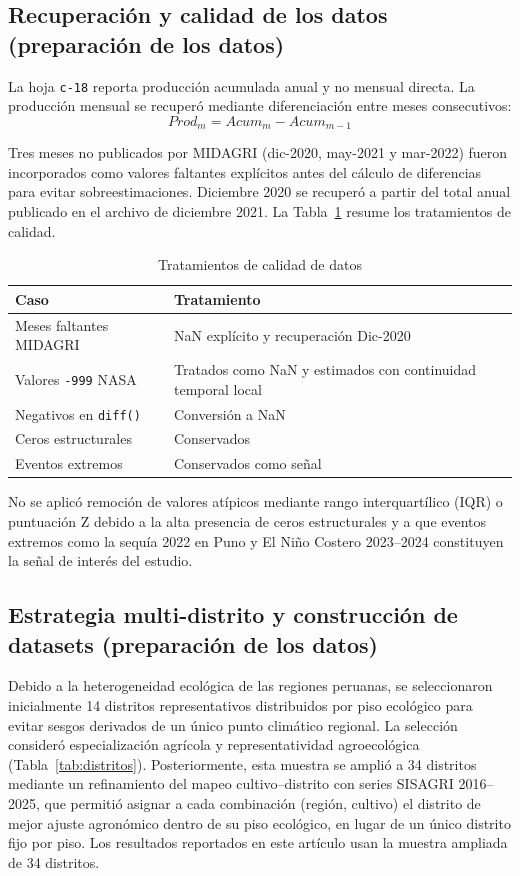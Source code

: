 \documentclass[conference]{IEEEtran}
\begin{document}
\subsection{Recuperación y calidad de los datos (preparación de los datos)}
\label{ssec:recuperacion}
La hoja \texttt{c-18} reporta producción acumulada anual y no mensual directa. La producción mensual se recuperó mediante diferenciación entre meses consecutivos:
\begin{equation}
Prod_{m} = Acum_{m} - Acum_{m-1}
\end{equation}

Tres meses no publicados por MIDAGRI (dic-2020, may-2021 y mar-2022) fueron incorporados como valores faltantes explícitos antes del cálculo de diferencias para evitar sobreestimaciones. Diciembre 2020 se recuperó a partir del total anual publicado en el archivo de diciembre 2021. La Tabla~\ref{tab:calidad} resume los tratamientos de calidad.

\begin{table}[h]
\centering
\caption{Tratamientos de calidad de datos}
\label{tab:calidad}
\small
\begin{tabular}{p{2cm} p{4.3cm}}
\toprule
\textbf{Caso} & \textbf{Tratamiento} \\
\midrule
Meses faltantes MIDAGRI & NaN explícito y recuperación Dic-2020 \\
Valores \texttt{-999} NASA & Tratados como NaN y estimados con continuidad temporal local \\
Negativos en \texttt{diff()} & Conversión a NaN \\
Ceros estructurales & Conservados \\
Eventos extremos & Conservados como señal \\
\bottomrule
\end{tabular}
\end{table}

No se aplicó remoción de valores atípicos mediante rango interquartílico (IQR) o puntuación Z debido a la alta presencia de ceros estructurales y a que eventos extremos como la sequía 2022 en Puno \cite{rcr2023} y El Niño Costero 2023--2024 \cite{senamhi2024} constituyen la señal de interés del estudio.

\subsection{Estrategia multi-distrito y construcción de datasets (preparación de los datos)}
\label{ssec:multidistrito}
Debido a la heterogeneidad ecológica de las regiones peruanas, se seleccionaron inicialmente 14 distritos representativos distribuidos por piso ecológico para evitar sesgos derivados de un único punto climático regional. La selección consideró especialización agrícola y representatividad agroecológica (Tabla~\ref{tab:distritos}). Posteriormente, esta muestra se amplió a 34 distritos mediante un refinamiento del mapeo cultivo--distrito con series SISAGRI 2016--2025, que permitió asignar a cada combinación (región, cultivo) el distrito de mejor ajuste agronómico dentro de su piso ecológico, en lugar de un único distrito fijo por piso. Los resultados reportados en este artículo usan la muestra ampliada de 34 distritos.
\end{document}

